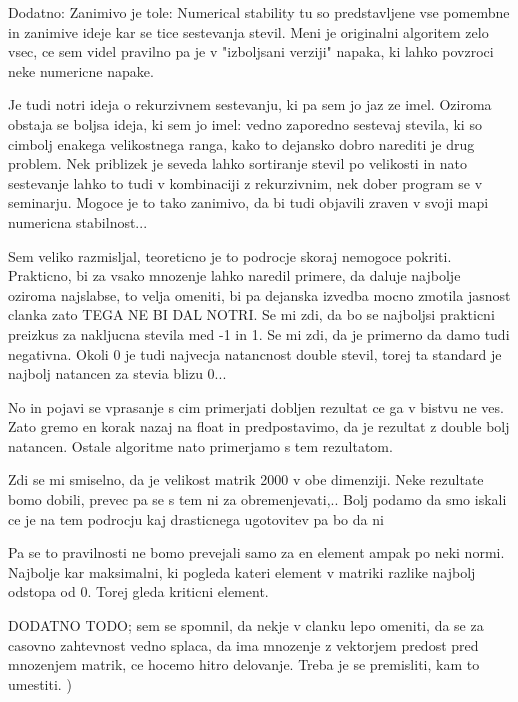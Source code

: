 \documentclass[a4paper,11pt]{article}
\begin{document}
Dodatno: 
Zanimivo je tole: Numerical stability
tu so predstavljene vse pomembne in zanimive ideje kar se tice sestevanja stevil. Meni je originalni algoritem zelo vsec, 
ce sem videl pravilno pa je v "izboljsani verziji" napaka, ki lahko povzroci neke numericne napake.

Je tudi notri ideja o rekurzivnem sestevanju, ki pa sem jo jaz ze imel. Oziroma obstaja se boljsa ideja, ki sem jo imel: 
vedno zaporedno sestevaj stevila, ki so cimbolj enakega velikostnega ranga, kako to dejansko dobro narediti je drug problem. Nek priblizek je seveda lahko sortiranje stevil po velikosti in nato sestevanje lahko to tudi v kombinaciji z rekurzivnim, nek dober program se v seminarju. 
Mogoce je to tako zanimivo, da bi tudi objavili zraven v svoji mapi numericna stabilnost...

Sem veliko razmisljal, teoreticno je to podrocje skoraj nemogoce pokriti. 
Prakticno, bi za vsako mnozenje lahko naredil primere, da daluje najbolje oziroma najslabse, to velja omeniti, bi pa dejanska izvedba mocno zmotila jasnost clanka zato TEGA NE BI DAL NOTRI.
Se mi zdi, da bo se najboljsi prakticni preizkus za nakljucna stevila med -1 in 1. Se mi zdi, da je primerno da damo tudi negativna. Okoli 0 je tudi najvecja natancnost double stevil, torej ta standard je najbolj natancen za stevia blizu 0...

No in pojavi se vprasanje s cim primerjati dobljen rezultat ce ga v bistvu ne ves. Zato gremo en korak nazaj na float in predpostavimo, da je rezultat z double bolj natancen. Ostale algoritme nato primerjamo s tem rezultatom.

Zdi se mi smiselno, da je velikost matrik 2000 v obe dimenziji. Neke rezultate bomo dobili, prevec pa se s tem ni za obremenjevati,.. 
Bolj podamo da smo iskali ce je na tem podrocju kaj drasticnega ugotovitev pa bo da ni

Pa se to pravilnosti ne bomo prevejali samo za en element ampak po neki normi. Najbolje kar maksimalni, ki pogleda kateri element v matriki razlike najbolj odstopa od 0. Torej gleda kriticni element.

DODATNO TODO; sem se spomnil, da nekje v clanku lepo omeniti, da se za casovno zahtevnost vedno splaca, da ima mnozenje z vektorjem predost pred mnozenjem matrik, ce hocemo hitro delovanje. Treba je se premisliti, kam to umestiti.
)
\end{document}
